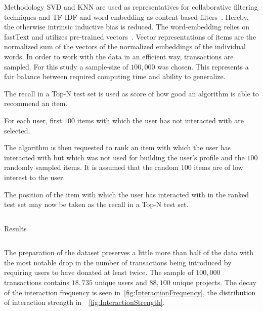 \documentclass[final]{beamer}
\begin{document}
\begin{frame}[t,fragile=singleslide]{}
\begin{columns}[t]
\begin{column}{0.45\textwidth}
\begin{block}{Methodology}
				SVD and KNN are used as representatives for collaborative filtering techniques and TF-IDF and word-embedding as content-based filters~\cite{scikit-learn,rehurek_lrec}. Hereby, the otherwise intrinsic inductive bias is reduced. The word-embedding relies on fastText and utilizes pre-trained vectors~\cite{DBLP:journals/corr/BojanowskiGJM16}. Vector representations of items are the normalized sum of the vectors of the normalized embeddings of the individual words. In order to work with the data in an efficient way, transactions are sampled. For this study a sample-size of $100,000$ was chosen. This represents a fair balance between required computing time and ability to generalize.

				The recall in a Top-N test set is used as score of how good an algorithm is able to recommend an item.
				\begin{enumerate*}[label= (\arabic*)]
					\item For each user, first $100$ items with which the user has not interacted with are selected.
					\item The algorithm is then requested to rank an item with which the user has interacted with but which was not used for building the user's profile and the $100$ randomly sampled items. It is assumed that the random $100$ items are of low interest to the user.
					\item The position of the item with which the user has interacted with in the ranked test set may now be taken as the recall in a Top-N test set.
				\end{enumerate*}
			\end{block}
		\end{column}
	\end{columns}

	\begin{columns}[t]
		\begin{column}{0.945\textwidth}
			\begin{block}{Results}
				\begin{columns}[t]
					\begin{column}{0.49\textwidth}
						The preparation of the dataset preserves a little more than half of the data with the most notable drop in the number of transactions being introduced by requiring users to have donated at least twice. The sample of $100,000$ transactions contains $18,735$ unique users and $88,100$ unique projects. The decay of the interaction frequency is seen in~\autoref{fig:InteractionFrequency}, the distribution of interaction strength in~~\autoref{fig:InteractionStrength}.


\end{column}
\end{columns}
\end{block}
\end{column}
\end{columns}
\end{frame}
\end{document}
